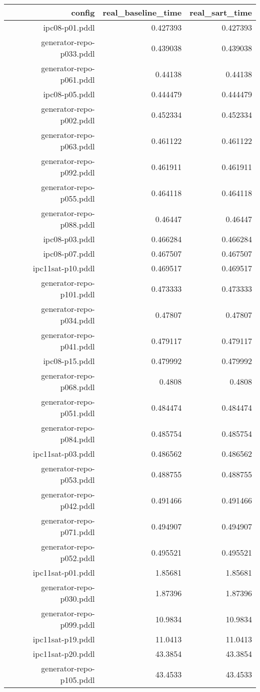 \documentclass{article}
\begin{document}
                            \begin{center}
                            \scriptsize
                            \begin{tabular}{r|r|r}
                            config & real\_baseline\_time & real\_sart\_time\\\midrule
                             ipc08-p01.pddl&0.427393&0.427393\\
 generator-repo-p033.pddl&0.439038&0.439038\\
 generator-repo-p061.pddl&0.44138&0.44138\\
 ipc08-p05.pddl&0.444479&0.444479\\
 generator-repo-p002.pddl&0.452334&0.452334\\
 generator-repo-p063.pddl&0.461122&0.461122\\
 generator-repo-p092.pddl&0.461911&0.461911\\
 generator-repo-p055.pddl&0.464118&0.464118\\
 generator-repo-p088.pddl&0.46447&0.46447\\
 ipc08-p03.pddl&0.466284&0.466284\\
 ipc08-p07.pddl&0.467507&0.467507\\
 ipc11sat-p10.pddl&0.469517&0.469517\\
 generator-repo-p101.pddl&0.473333&0.473333\\
 generator-repo-p034.pddl&0.47807&0.47807\\
 generator-repo-p041.pddl&0.479117&0.479117\\
 ipc08-p15.pddl&0.479992&0.479992\\
 generator-repo-p068.pddl&0.4808&0.4808\\
 generator-repo-p051.pddl&0.484474&0.484474\\
 generator-repo-p084.pddl&0.485754&0.485754\\
 ipc11sat-p03.pddl&0.486562&0.486562\\
 generator-repo-p053.pddl&0.488755&0.488755\\
 generator-repo-p042.pddl&0.491466&0.491466\\
 generator-repo-p071.pddl&0.494907&0.494907\\
 generator-repo-p052.pddl&0.495521&0.495521\\
 ipc11sat-p01.pddl&1.85681&1.85681\\
 generator-repo-p030.pddl&1.87396&1.87396\\
 generator-repo-p099.pddl&10.9834&10.9834\\
 ipc11sat-p19.pddl&11.0413&11.0413\\
 ipc11sat-p20.pddl&43.3854&43.3854\\
 generator-repo-p105.pddl&43.4533&43.4533
                            \end{tabular}
                            \end{center}
                    
\end{document}
